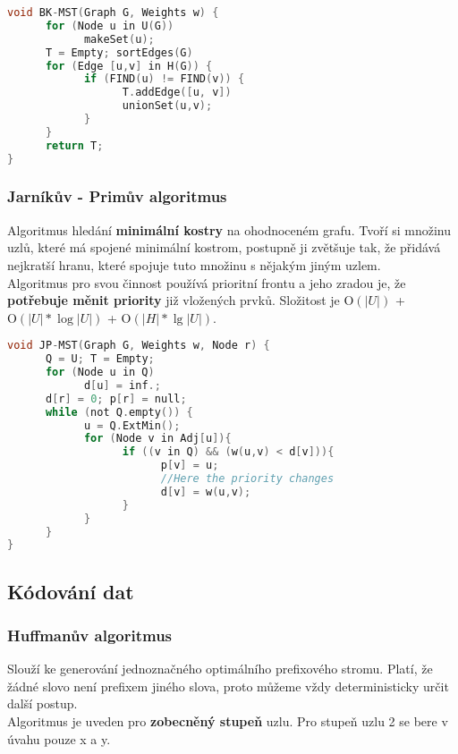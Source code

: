 \documentclass[12pt]{article}
\begin{document}
\begin{lstlisting}[language=c]
void BK-MST(Graph G, Weights w) {
      for (Node u in U(G)) 
            makeSet(u);
      T = Empty; sortEdges(G)
      for (Edge [u,v] in H(G)) {
            if (FIND(u) != FIND(v)) {
                  T.addEdge([u, v])
                  unionSet(u,v);
            } 
      }
      return T;
}
\end{lstlisting}

\subsubsection{Jarníkův - Primův algoritmus}
Algoritmus hledání \textbf{minimální kostry} na ohodnoceném grafu. Tvoří si množinu uzlů, které má spojené minimální kostrom, postupně ji zvětšuje tak, že přidává nejkratší hranu, které spojuje tuto množinu s nějakým jiným uzlem.\\
Algoritmus pro svou činnost používá prioritní frontu a jeho zradou je, že \textbf{potřebuje měnit priority} již vložených prvků.
Složitost je $\textrm{O}(\left|U\right|)$ + $\textrm{O}(\left|U\right| * \log \left|U\right|)$ + $\textrm{O}(\left|H\right| * \lg \left|U\right|)$.

\begin{lstlisting}[language=c]
void JP-MST(Graph G, Weights w, Node r) {
      Q = U; T = Empty;
      for (Node u in Q) 
            d[u] = inf.;
      d[r] = 0; p[r] = null;
      while (not Q.empty()) {
            u = Q.ExtMin();
            for (Node v in Adj[u]){
                  if ((v in Q) && (w(u,v) < d[v])){
                        p[v] = u;
                        //Here the priority changes 
                        d[v] = w(u,v);
                  }
            }
      }
}
\end{lstlisting}


\subsection{Kódování dat}
\subsubsection{Huffmanův algoritmus}
Slouží ke generování jednoznačného optimálního prefixového stromu. Platí, že žádné slovo není prefixem jiného slova, proto můžeme vždy deterministicky určit další postup.\\
Algoritmus je uveden pro \textbf{zobecněný stupeň} uzlu. Pro stupeň uzlu 2 se bere v úvahu pouze x a y.\\
\end{document}
